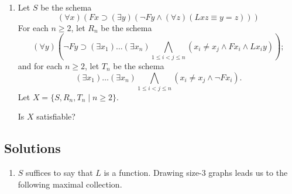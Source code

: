 \begin{mdframed}[linewidth=1]
\begin{enumerate}
    \item Let $S$ be the schema
    \[
            (\forall x)(Fx\supset(\exists y)(\neg Fy\wedge(\forall z)(Lxz\equiv y=z)))
    \]
    For each $n\geq 2$, let $R_n$ be the schema
    \[
    (\forall y)(\neg Fy\supset(\exists x_1)\ldots(\exists x_n)\bigwedge_{1\leq i<j\leq n}(x_i\neq x_j\wedge Fx_i\wedge Lx_iy));
    \]
    and for each $n\geq 2$, let $T_n$ be the schema
    \[
    (\exists x_1)\ldots(\exists x_n)\bigwedge_{1\leq i<j\leq n}(x_i\neq x_j\wedge \neg Fx_i).
    \]
    Let $X=\{S,R_n,T_n\mid n\geq 2\}$.

    Is $X$ satisfiable?

\end{enumerate}
\end{mdframed}

\newpage
\begin{mdframed}[linewidth=1]
\section*{Solutions}
\begin{enumerate}
    \item $S$ suffices to say that $L$ is a function. Drawing size-3 graphs leads us to the following maximal collection. 



\end{enumerate}
\end{mdframed}
